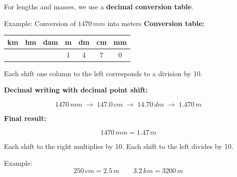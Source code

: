 \documentclass[11pt,a4paper]{article}
\newcommand{\theorybox}[2]{
\begin{tcolorbox}[title=\textbf{#1}]
#2
\end{tcolorbox}
}
\begin{document}
\theorybox{D - Decimal conversion (lengths, masses)}{
For lengths and masses, we use a \textbf{decimal conversion table}.

Example: Conversion of $1470\,\si{mm}$ into meters  
\textbf{Conversion table:}

\begin{center}
\begin{tabular}{c|c|c|c|c|c|c}
km & hm & dam & m & dm & cm & mm \\
\hline
   &    &     & 1 & 4  & 7  & 0  \\
\end{tabular}
\end{center}

Each shift one column to the left corresponds to a division by 10.

\vspace{0.2cm}

\textbf{Decimal writing with decimal point shift:}

\[
1470\,\si{mm}
\;\longrightarrow\;
147.\!0\,\si{cm}
\;\longrightarrow\;
14.\!70\,\si{dm}
\;\longrightarrow\;
1.\!470\,\si{m}
\]

\vspace{0.2cm}

\textbf{Final result:}

\[
1470\,\si{mm} = 1.47\,\si{m}
\]

Each shift to the right multiplies by 10.  
Each shift to the left divides by 10.

Example:
\[
250\,\si{cm} = 2.5\,\si{m}
\qquad
3.2\,\si{km} = 3200\,\si{m}
\]
}
\end{document}
